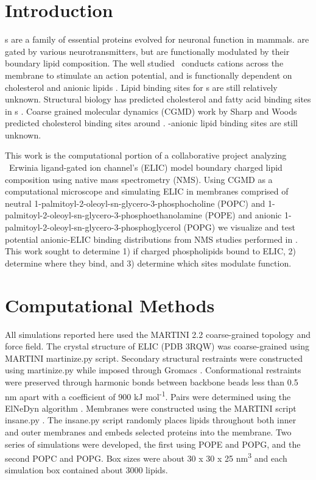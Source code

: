 \section[]{Introduction} 

\plgic s are a family of essential proteins evolved for neuronal function in mammals. \plgic are gated by various neurotransmitters, but are functionally modulated by their boundary lipid composition. The well studied \plgic~\nachr conducts cations across the membrane to stimulate an action potential, and is functionally dependent on cholesterol and anionic lipids \citep{Dalziel1980,Ellena1983,M.CriadoH.Eibl1982,Fong1986,Fong1987,Jones1988a,Sunshine1994,DaCosta2009b}. Lipid binding sites for \plgic s are still relatively unknown.  Structural biology has predicted cholesterol and fatty acid binding sites in \plgic s \citep{Laverty2017,Basak2017}. Coarse grained molecular dynamics (CGMD) work by Sharp\citep{Sharp2019} and Woods\citep{Woods2019} predicted cholesterol binding sites around \nachr. \plgic-anionic lipid binding sites are still unknown. 

This work is the computational portion of a collaborative project analyzing \plgic~Erwinia ligand-gated ion channel's (ELIC) model boundary charged lipid composition using native mass spectrometry (NMS). Using CGMD as a computational microscope and simulating ELIC in membranes comprised of neutral 1-palmitoyl-2-oleoyl-sn-glycero-3-phosphocholine (POPC) and 1-palmitoyl-2-oleoyl-sn-glycero-3-phosphoethanolamine (POPE) and anionic 1-palmitoyl-2-oleoyl-sn-glycero-3-phosphoglycerol (POPG) we visualize and test potential anionic-ELIC binding distributions from NMS studies performed in \citep{Tong2019}. This work sought to determine 1) if charged phospholipids bound to ELIC, 2) determine where they bind, and 3) determine which sites modulate function.

\section[]{Computational Methods}
All simulations reported here used the MARTINI 2.2 \citep{DeJong2012} coarse-grained
topology and force field. The crystal structure of ELIC (PDB 3RQW) \citep{Pan2012}
was coarse-grained using MARTINI martinize.py script. Secondary
structural restraints were constructed using martinize.py while imposed
through Gromacs \citep{Berendsen1995}. Conformational restraints were preserved through
harmonic bonds between backbone beads less than 0.5 nm apart with a
coefficient of 900 kJ mol\textsuperscript{-1}. Pairs were determined
using the ElNeDyn algorithm \citep{Periole2009}. Membranes were constructed using the
MARTINI script insane.py \citep{Wassenaar2015}. The insane.py script randomly places
lipids throughout both inner and outer membranes and embeds selected
proteins into the membrane. Two series of simulations were developed,
the first using POPE and POPG, and the second POPC and POPG. Box sizes
were about 30 x 30 x 25 nm\textsuperscript{3} and each simulation box
contained about 3000 lipids.

